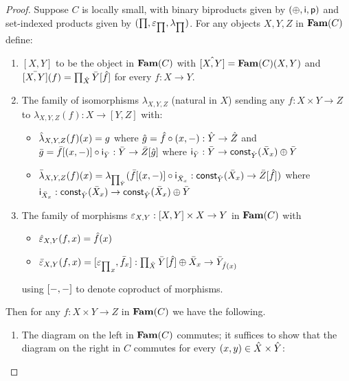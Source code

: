 \begin{proof}
Suppose $C$ is locally small, with binary biproducts given by $(\oplus,\mathsf{i},\mathsf{p})$ and set-indexed products
given by $(\prod,\varepsilon_{\prod},\lambda_{\prod})$. For any objects $X, Y, Z$ in $\mathbf{Fam}(C)$ define:

\begin{enumerate}
\item $[X, Y]$ to be the object in $\mathbf{Fam}(C)$ with $\hat{[X,Y]} = \mathbf{Fam}(C)(X,Y)$ and $\bar{[X, Y]}(f) =
\prod_{\hat{X}}\bar{Y}[\hat{f}]$ for every $f: X \to Y$.
\item The family of isomorphisms $\lambda_{X,Y,Z}$ (natural in $X$) sending any $f: X \times Y \to Z$ to
$\lambda_{X,Y,Z}(f): X \to [Y, Z]$ with:
\begin{itemize}
\item $\hat{\lambda}_{X,Y,Z}(f)(x) = g$ where $\hat{g} = \hat{f} \circ (x, -): \hat{Y} \to \hat{Z}$ and
$\bar{g} = \bar{f}[(x,-)] \circ \mathsf{i}_{\bar{Y}}: \bar{Y} \to \bar{Z}[\hat{g}]$ where $\mathsf{i}_{\bar{Y}}:
\bar{Y} \to \mathsf{const}_{\hat{Y}}(\bar{X}_x) \oplus \bar{Y}$
\item $\bar{\lambda}_{X,Y,Z}(f)(x) = \lambda_{\prod_{\hat{Y}}}(\bar{f}[(x,-)] \circ \mathsf{i}_{\bar{X}_x}:
\mathsf{const}_{\hat{Y}}(\bar{X}_x) \to \bar{Z}[\hat{f}])$ where $\mathsf{i}_{\bar{X}_x}: \mathsf{const}_{\hat{Y}}(\bar{X}_x)
\to \mathsf{const}_{\hat{Y}}(\bar{X}_x) \oplus \bar{Y}$
\end{itemize}
\item The family of morphisms $\varepsilon_{X,Y}: [X, Y] \times X \to Y$ in $\mathbf{Fam}(C)$ with
\begin{itemize}
\item $\hat{\varepsilon}_{X,Y}(f, x) = \hat{f}(x)$
\item $\bar{\varepsilon}_{X,Y}(f, x) = [{\varepsilon_{\prod}}_x, \bar{f}_x]:
\prod_{\hat{X}}\bar{Y}[\hat{f}] \oplus \bar{X}_x \to \bar{Y}_{\hat{f}(x)}$
\end{itemize}
using $[-, -]$ to denote coproduct of morphisms.
\end{enumerate}
Then for any $f: X \times Y \to Z$ in $\mathbf{Fam}(C)$ we have the following.
\begin{enumerate}
\item The diagram on the left in $\mathbf{Fam}(C)$ commutes; it suffices to show that the diagram on the right in $C$
commutes for every $(x, y) \in \hat{X} \times \hat{Y}$:


\end{enumerate}
\end{proof}
